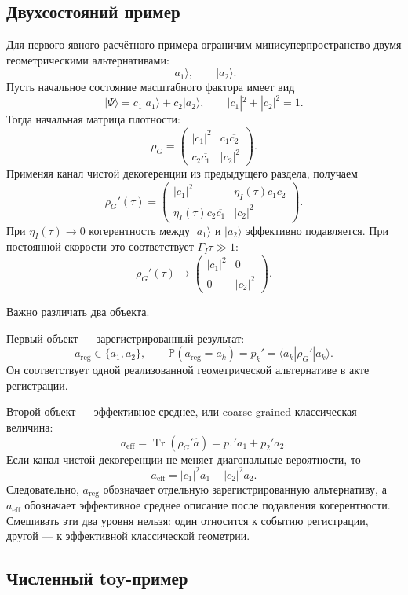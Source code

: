 \documentclass[12pt,a4paper]{article}
\DeclareMathOperator{\Tr}{Tr}
\newcommand{\Prob}{\mathbb P}
\newcommand{\Eff}{\mathrm{eff}}
\begin{document}
\subsection{Двухсостояний пример}

Для первого явного расчётного примера ограничим минисуперпространство двумя геометрическими альтернативами:
\[
|a_1\rangle,
\qquad
|a_2\rangle.
\]
Пусть начальное состояние масштабного фактора имеет вид
\[
\boxed{
|\Psi\rangle
=
c_1|a_1\rangle+c_2|a_2\rangle,
\qquad
|c_1|^2+|c_2|^2=1.
}
\]
Тогда начальная матрица плотности:
\[
\rho_G
=
\begin{pmatrix}
|c_1|^2 & c_1\overline{c_2}\\
c_2\overline{c_1} & |c_2|^2
\end{pmatrix}.
\]
Применяя канал чистой декогеренции из предыдущего раздела, получаем
\[
\boxed{
\rho_G'(\tau)
=
\begin{pmatrix}
|c_1|^2 & \eta_I(\tau)c_1\overline{c_2}\\
\eta_I(\tau)c_2\overline{c_1} & |c_2|^2
\end{pmatrix}.
}
\]
При $\eta_I(\tau)\to0$ когерентность между $|a_1\rangle$ и $|a_2\rangle$ эффективно подавляется. При постоянной скорости это соответствует $\Gamma_I\tau\gg1$:
\[
\rho_G'(\tau)
\longrightarrow
\begin{pmatrix}
|c_1|^2 & 0\\
0 & |c_2|^2
\end{pmatrix}.
\]

Важно различать два объекта.

Первый объект --- зарегистрированный результат:
\[
\boxed{
a_{\mathrm{reg}}\in\{a_1,a_2\},
\qquad
\Prob(a_{\mathrm{reg}}=a_k)=p_k'=
\langle a_k|\rho_G'|a_k\rangle.
}
\]
Он соответствует одной реализованной геометрической альтернативе в акте регистрации.

Второй объект --- эффективное среднее, или coarse-grained классическая величина:
\[
\boxed{
a_{\Eff}
=
\Tr(\rho_G'\widehat a)
=
p_1'a_1+p_2'a_2.
}
\]
Если канал чистой декогеренции не меняет диагональные вероятности, то
\[
\boxed{
a_{\Eff}
=
|c_1|^2a_1+|c_2|^2a_2.
}
\]
Следовательно, $a_{\mathrm{reg}}$ обозначает отдельную зарегистрированную альтернативу, а $a_{\Eff}$ обозначает эффективное среднее описание после подавления когерентности. Смешивать эти два уровня нельзя: один относится к событию регистрации, другой --- к эффективной классической геометрии.


\subsection{Численный toy-пример}
\end{document}
